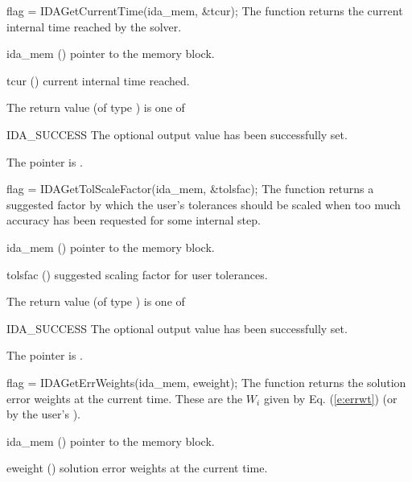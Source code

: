 {{
  flag = IDAGetCurrentTime(ida\_mem, \&tcur);
}
{
  The function  returns the
  current internal time reached by the solver.
}
{
  \begin{args}
  \item[ida\_mem] ()
    pointer to the {\ida} memory block.
  \item[tcur] ()
    current internal time reached.
  \end{args}
}
{
  The return value  (of type ) is one of
  \begin{args}
  \item[IDA\_SUCCESS] 
    The optional output value has been successfully set.
  \item[\Id{IDA\_MEM\_NULL}]
    The  pointer is .
  \end{args}
}
{}
{
  flag = IDAGetTolScaleFactor(ida\_mem, \&tolsfac);
}
{
  The function  returns a
  suggested factor by which the user's tolerances 
  should be scaled when too much accuracy has been 
  requested for some internal step.
}
{
  \begin{args}[tolsfac]
  \item[ida\_mem] ()
    pointer to the {\ida} memory block.
  \item[tolsfac] ()
    suggested scaling factor for user tolerances.
  \end{args}
}
{
  The return value  (of type ) is one of
  \begin{args}
  \item[IDA\_SUCCESS] 
    The optional output value has been successfully set.
  \item[\Id{IDA\_MEM\_NULL}]
    The  pointer is .
  \end{args}
}
{}
{
  flag = IDAGetErrWeights(ida\_mem, eweight);
}
{
  The function  returns the solution error weights 
  at the current time. These are the $W_i$ given by Eq. (\ref{e:errwt})
  (or by the user's ).
}
{
  \begin{args}[eweight]
  \item[ida\_mem] ()
    pointer to the {\ida} memory block.
  \item[eweight] ()
    solution error weights at the current time.
  \end{args}
}}
